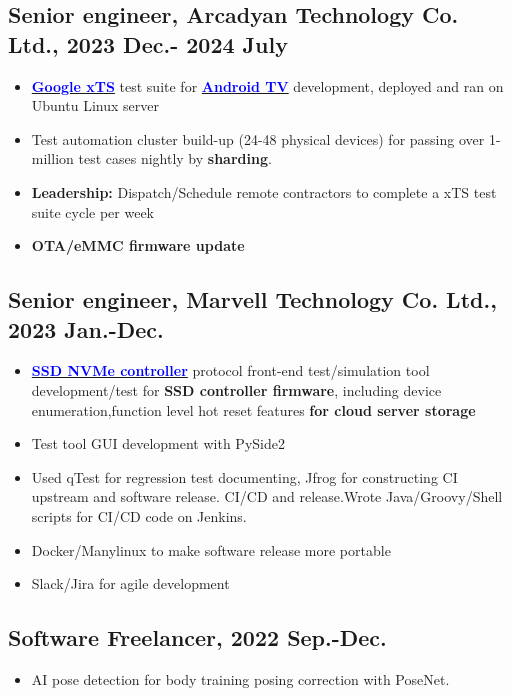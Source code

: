 \documentclass[11pt]{article}
\begin{document}
\begin{multicols*}{2}
\subsection*{Senior engineer, Arcadyan Technology Co. Ltd., 2023 Dec.- 2024 July }
\begin{itemize}[noitemsep]
    \item \href{https://source.android.com/docs/compatibility/cts}{\textbf{\textcolor{blue}{Google xTS}}} test suite for \href{https://www.arcadyan.com/zh-hant/solutions/idea/stb/}{\textbf{\textcolor{blue}{Android TV}}} development, deployed and ran on Ubuntu Linux server
    \item Test automation cluster build-up (24-48 physical devices) for passing over 1-million test cases nightly by \textbf{sharding}.
    \item \textbf{Leadership:} Dispatch/Schedule remote contractors to complete a xTS test suite cycle per week
    \item \textbf{OTA/eMMC firmware update}
\end{itemize}

\vspace{0.8em}

\subsection*{Senior engineer, Marvell Technology Co. Ltd., 2023 Jan.-Dec.}
\begin{itemize}[noitemsep]
    \item \href{https://www.marvell.com/embedded-processors/armada-cp/}{\textbf{\textcolor{blue}{SSD NVMe controller}}} protocol front-end test/simulation tool development/test for \textbf{SSD controller firmware}, including device enumeration,function level hot reset features\textbf{ for cloud server storage}
    \item Test tool GUI development with PySide2
    \item Used qTest for regression test documenting, Jfrog for constructing CI upstream and software release. CI/CD and release.Wrote Java/Groovy/Shell scripts for CI/CD code on Jenkins.
    \item Docker/Manylinux to make software release more portable
    \item Slack/Jira for agile development
\end{itemize}

\vspace{0.8em}

\subsection*{Software Freelancer, 2022 Sep.-Dec.}
\begin{itemize}[noitemsep]
    \item AI pose detection for body training posing correction with PoseNet.
\end{itemize}


\end{multicols*}
\end{document}
